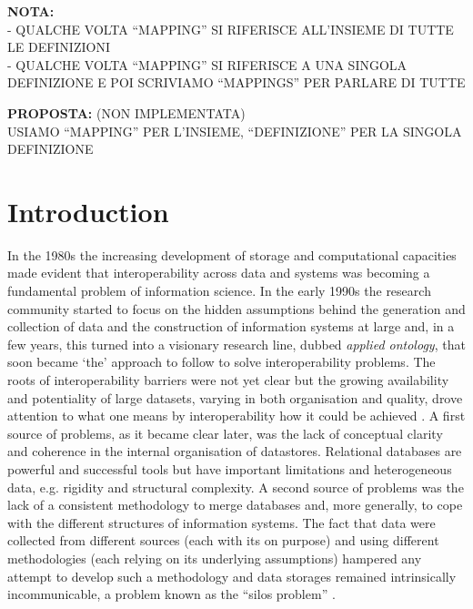 \documentclass[ao]{iosart2x}
\begin{document}
\noindent
{\bf NOTA:}\\
- QUALCHE VOLTA ``MAPPING'' SI RIFERISCE ALL'INSIEME DI TUTTE LE DEFINIZIONI\\
- QUALCHE VOLTA ``MAPPING'' SI RIFERISCE A UNA SINGOLA DEFINIZIONE E POI SCRIVIAMO ``MAPPINGS'' PER PARLARE DI TUTTE

\medskip
\noindent
{\bf PROPOSTA:} (NON IMPLEMENTATA)\\ 
USIAMO ``MAPPING'' PER L'INSIEME, ``DEFINIZIONE'' PER LA SINGOLA DEFINIZIONE\\



\section{Introduction}\label{sect_intro}



In the 1980s the increasing development of storage and computational capacities made evident that interoperability across data and systems was becoming a fundamental problem of information science. In the early 1990s the research community started to focus on the hidden assumptions behind the generation and collection of data and the construction of information systems at large and, in a few years, this turned into a visionary research line, dubbed {\em applied ontology}, that soon became `the' approach to follow to solve interoperability problems. 
The roots of interoperability barriers were not yet clear but the growing availability and potentiality of large datasets, varying in both organisation and quality, drove attention to what one means by interoperability how it could be achieved \citep{?}. 
A first source of problems, as it became clear later, was the lack of conceptual clarity and coherence in the internal organisation of datastores. Relational databases are powerful and successful tools but have important limitations and heterogeneous data, e.g. rigidity and structural complexity. 
A second source of problems was the lack of a consistent methodology to merge databases and, more generally, to cope with the different structures of information systems. The fact that data were collected from different sources (each with its on purpose) and using different methodologies (each relying on its underlying assumptions) hampered any attempt to develop such a methodology and data storages remained intrinsically incommunicable, a problem known as the ``silos problem'' \citep{?}.
\end{document}
